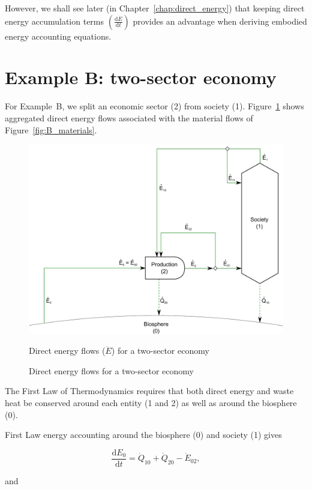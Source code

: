 However, we shall see later (in Chapter~\ref{chap:direct_energy}) 
that keeping direct energy accumulation terms
$\left( \frac{\mathrm{d}\dot{E}}{\mathrm{d}t} \right)$ 
provides an advantage when deriving embodied energy accounting equations.


\section{Example B: two-sector economy}
\label{sec:B_energy}

For Example~B, we split an economic sector (2) from 
society (1). Figure~\ref{fig:B_energy} shows aggregated
direct energy flows associated with the material flows of Figure~\ref{fig:B_materials}.

\begin{figure}[!ht]
\centering
\includegraphics[width=0.8\linewidth]{Part_2/Chapter_Energy/images/2_sector_direct_energy.pdf}
\caption{Direct energy flows for a two-sector economy}{Direct energy flows ($\dot{E}$) for a two-sector economy}
\label{fig:B_energy}
\end{figure}

The First Law of Thermodynamics
requires that both 
direct energy and 
waste heat 
be conserved around each 
entity (1 and 2) as well as around the biosphere (0).

First Law energy accounting around the biosphere (0) and society (1) gives

\begin{equation} \label{eq:CV_E_dot_0}
	\frac{\mathrm{d}E_{0}}{\mathrm{d}t} 	 
	= \dot{Q}_{10} 
	+ \dot{Q}_{20} 
	- \dot{E}_{02},
\end{equation}

\noindent and 

